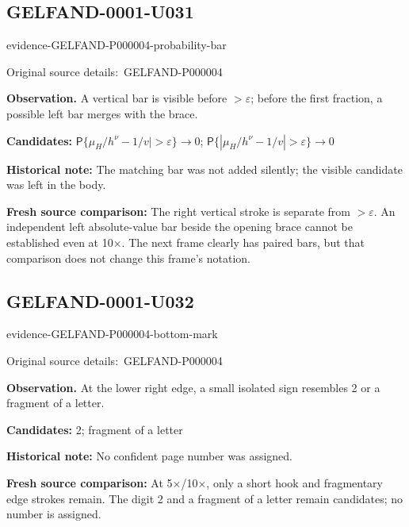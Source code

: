 \documentclass[11pt]{article}
\newcommand{\EvidenceBlock}[4]{%
 \par\smallskip\noindent\begin{minipage}{\linewidth}
 \begin{minipage}[t]{.47\linewidth}\vspace{0pt}\centering
 \csname evidence-#1-#2\endcsname\par
 {\scriptsize\SourceCropCaption\ #1}\par
 \end{minipage}\hfill
 \begin{minipage}[t]{.49\linewidth}\vspace{0pt}\raggedright
 {\small\color{orange!65!black}\textbf{#4} #3}\par
 \end{minipage}
 \end{minipage}\par\smallskip}
\newcommand{\SourceCropCaption}{Original source details:}\newcommand{\ReadingCaption}{Uncertain reading.}\newcommand{\IncompleteCaption}{Undeciphered passage.}\newcommand{\DiagramCaption}{Diagram and typed description.}
\begin{document}
\subsection*{GELFAND-0001-U031}
\EvidenceBlock{GELFAND-P000004}{probability-bar}{A vertical bar is visible before \(>\varepsilon\); before the first fraction, a possible left bar merges with the brace.}{Observation.}
\par\smallskip\noindent\textbf{Candidates: } \(\mathsf P\{\mu_H/h^\nu-1/v\mid>\varepsilon\}\to0\); \(\mathsf P\{|\mu_H/h^\nu-1/v|>\varepsilon\}\to0\)\par
\par\smallskip\noindent\textbf{Historical note: } The matching bar was not added silently; the visible candidate was left in the body.\par
\par\smallskip\noindent\textbf{Fresh source comparison: } The right vertical stroke is separate from \(>\varepsilon\). An independent left absolute-value bar beside the opening brace cannot be established even at 10×. The next frame clearly has paired bars, but that comparison does not change this frame’s notation.\par

\subsection*{GELFAND-0001-U032}
\EvidenceBlock{GELFAND-P000004}{bottom-mark}{At the lower right edge, a small isolated sign resembles 2 or a fragment of a letter.}{Observation.}
\par\smallskip\noindent\textbf{Candidates: } 2; fragment of a letter\par
\par\smallskip\noindent\textbf{Historical note: } No confident page number was assigned.\par
\par\smallskip\noindent\textbf{Fresh source comparison: } At 5×/10×, only a short hook and fragmentary edge strokes remain. The digit 2 and a fragment of a letter remain candidates; no number is assigned.\par
\end{document}
